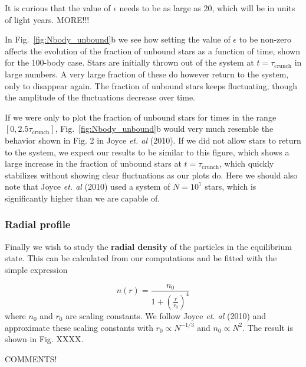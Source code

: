 \documentclass{article}
\begin{document}
\begin{multicols}{2}
It is curious that the value of $\epsilon$ needs to be as large as 20, which will be in units of light years. MORE!!!

In Fig.~\ref{fig:Nbody_unbound}b we see how setting the value of $\epsilon$ to be non-zero affects the evolution of the fraction of unbound stars as a function of time, shown for the 100-body case. Stars are initially thrown out of the system at $t = \tau_{\mathrm{crunch}}$ in large numbers. A very large fraction of these do however return to the system, only to disappear again. The fraction of unbound stars keeps fluctuating, though the amplitude of the fluctuations decrease over time.

If we were only to plot the fraction of unbound stars for times in the range $[0,2.5\tau_{\mathrm{crunch}}]$, Fig.~\ref{fig:Nbody_unbound}b would very much resemble the behavior shown in Fig. 2 in Joyce \textit{et. al} (2010). If we did not allow stars to return to the system, we expect our results to be similar to this figure, which shows a large increase in the fraction of unbound stars at $t = \tau_{\mathrm{crunch}}$, which quickly stabilizes without showing clear fluctuations as our plots do. Here we should also note that Joyce \textit{et. al} (2010) used a system of $N = 10^7$ stars, which is significantly higher than we are capable of.



\subsubsection{Radial profile}

Finally we wish to study the \textbf{radial density} of the particles in the equilibrium state. This can be calculated from our computations and be fitted with the simple expression

\begin{equation}\label{eq:simple_fit}
	n(r) = \frac{n_0}{1 + (\frac{r}{r_0})^4}
\end{equation}
where $n_0$ and $r_0$ are scaling constants. We follow Joyce \textit{et. al} (2010) and approximate these scaling constants with $r_0 \propto N^{-1/3}$ and $n_0 \propto N^2$. The result is shown in Fig. XXXX. 

COMMENTS!


\end{multicols}
\end{document}
